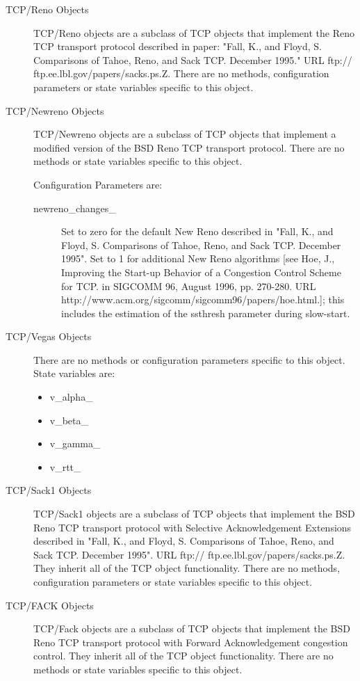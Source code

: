 \begin{description}
\item[TCP/Reno Objects]
TCP/Reno objects are a subclass of TCP objects that implement the Reno TCP
transport protocol described in paper: "Fall, K., and Floyd, S.
Comparisons of Tahoe, Reno, and Sack TCP. December 1995." URL ftp://
ftp.ee.lbl.gov/papers/sacks.ps.Z. There are no methods,
configuration parameters or state variables specific to this object. 

\item[TCP/Newreno Objects]
TCP/Newreno objects are a subclass of TCP objects that implement a
modified version of the BSD Reno TCP transport protocol. 
There are no methods or state variables specific to this object. 

Configuration Parameters are:
\begin{description}

\item[newreno\_changes\_]
Set to zero for the default New Reno described in "Fall, K., and Floyd, S.
Comparisons of Tahoe, Reno, and Sack TCP. December 1995". Set to 1 for
additional New Reno algorithms [see Hoe, J., Improving the Start-up
Behavior of a Congestion Control Scheme for TCP. in SIGCOMM 96, August
1996, pp. 270-280. URL 
http://www.acm.org/sigcomm/sigcomm96/papers/hoe.html.]; this includes the
estimation of the ssthresh parameter during slow-start. 
\end{description}


\item[TCP/Vegas Objects]
There are no methods or configuration parameters specific to this
object. State variables are:
\begin{itemize}
\item v\_alpha\_
\item v\_beta\_
\item v\_gamma\_
\item v\_rtt\_
\end{itemize}


\item[TCP/Sack1 Objects]
TCP/Sack1 objects are a subclass of TCP objects that implement the BSD
Reno TCP transport protocol with Selective Acknowledgement Extensions
described in "Fall, K., and Floyd, S. Comparisons of Tahoe, Reno, and
Sack TCP. December 1995". URL ftp:// ftp.ee.lbl.gov/papers/sacks.ps.Z. 
They inherit all of the TCP object functionality. There are no methods,
configuration parameters or state variables specific to this object. 


\item[TCP/FACK Objects]
TCP/Fack objects are a subclass of TCP objects that implement the BSD Reno
TCP transport protocol with Forward Acknowledgement congestion control. 
They inherit all of the TCP object functionality. There are no methods or
state variables specific to this object. 


\end{description}
